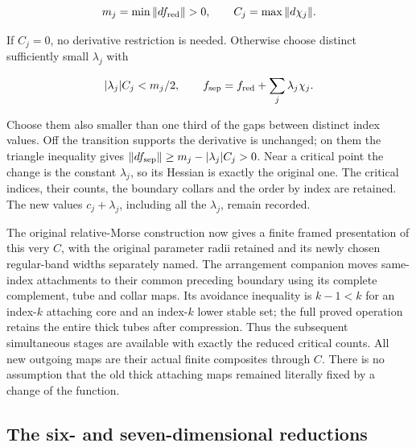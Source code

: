 \begin{equation}
m_j=\min\|df_{\rm red}\|>0,\qquad
 C_j=\max\|d\chi_j\|.
 \label{courseIII:realizing-framed-handles-and-middle-cancellation:eq:5.6}
\end{equation}

If \(C_j=0\), no derivative restriction is needed. Otherwise choose distinct sufficiently small \(\lambda_j\) with

\begin{equation}
|\lambda_j|C_j<m_j/2,
 \qquad
 f_{\rm sep}=f_{\rm red}+\sum_j\lambda_j\chi_j.
 \label{courseIII:realizing-framed-handles-and-middle-cancellation:eq:5.7}
\end{equation}

Choose them also smaller than one third of the gaps between distinct index values. Off the transition supports the derivative is unchanged; on them the triangle inequality gives \(\|df_{\rm sep}\|\geq m_j-|\lambda_j|C_j>0\). Near a critical point the change is the constant \(\lambda_j\), so its Hessian is exactly the original one. The critical indices, their counts, the boundary collars and the order by index are retained. The new values \(c_j+\lambda_j\), including all the \(\lambda_j\), remain recorded.

The original relative-Morse construction now gives a finite framed presentation of this very \(C\), with the original parameter radii retained and its newly chosen regular-band widths separately named. The arrangement companion moves same-index attachments to their common preceding boundary using its complete complement, tube and collar maps. Its avoidance inequality is \(k-1<k\) for an index-\(k\) attaching core and an index-\(k\) lower stable set; the full proved operation retains the entire thick tubes after compression. Thus the subsequent simultaneous stages are available with exactly the reduced critical counts. All new outgoing maps are their actual finite composites through \(C\). There is no assumption that the old thick attaching maps remained literally fixed by a change of the function.

\subsection{The six- and seven-dimensional reductions}
\label{courseIII:realizing-framed-handles-and-middle-cancellation:middle-six-seven-reduction}

\label{courseIII:realizing-framed-handles-and-middle-cancellation:section-6}\label{courseIII:middle-cancel:6}

